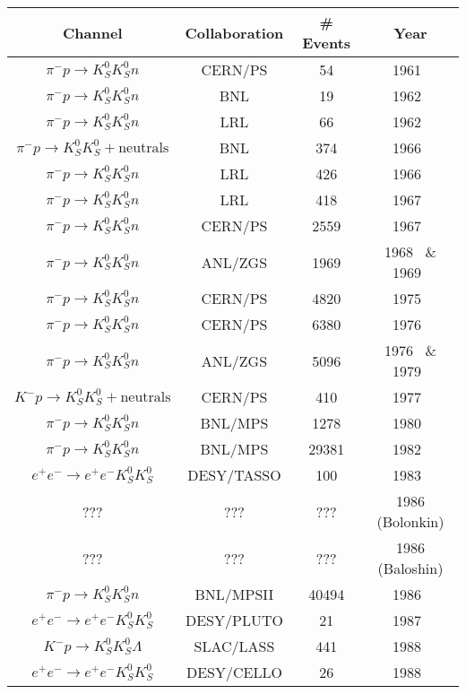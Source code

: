 \begin{table}
  \begin{center}
    \begin{tabular}{cccc}\toprule
      Channel & Collaboration & \# Events & Year\\\midrule
      $\pi^- p \to K_S^0 K_S^0 n$ & CERN/PS & 54 & 1961~\cite{DiCorato1961}\\
      $\pi^- p \to K_S^0 K_S^0 n$ & BNL & 19 & 1962~\cite{Erwin1962}\\
    $\pi^- p \to K_S^0 K_S^0 n$ & LRL & 66 & 1962~\cite{Alexander1962}\\
    $\pi^- p \to K_S^0 K_S^0 + \text{neutrals}$ & BNL & 374 & 1966~\cite{Crennell1966}\\
  $\pi^- p \to K_S^0 K_S^0 n$ & LRL & 426 & 1966~\cite{Hess1966}\\
  $\pi^- p \to K_S^0 K_S^0 n$ & LRL & 418 & 1967~\cite{Dahl1967}\\
  $\pi^- p \to K_S^0 K_S^0 n$ & CERN/PS & 2559 & 1967~\cite{Beusch1967}\\
  $\pi^- p \to K_S^0 K_S^0 n$ & ANL/ZGS & 1969 & 1968~\cite{Hoang1968} \& 1969~\cite{Hoang1969}\\
$\pi^- p \to K_S^0 K_S^0 n$ & CERN/PS & 4820 & 1975~\cite{Beusch1975}\\
$\pi^- p \to K_S^0 K_S^0 n$ & CERN/PS & 6380 & 1976~\cite{Wetzel1976}\\
$\pi^- p \to K_S^0 K_S^0 n$ & ANL/ZGS & 5096 & 1976~\cite{Cason1976} \& 1979~\cite{Polychronakos1979}\\
$K^- p \to K_S^0 K_S^0 + \text{neutrals}$ & CERN/PS & 410 & 1977~\cite{Barreiro1977}\\
$\pi^- p \to K_S^0 K_S^0 n$ & BNL/MPS & 1278 & 1980~\cite{Gottesman1980}\\
$\pi^- p \to K_S^0 K_S^0 n$ & BNL/MPS & 29381 & 1982~\cite{Etkin1982}\\
$e^+e^- \to e^+e^- K_S^0 K_S^0$ & DESY/TASSO & 100 & 1983~\cite{Althoff1983}\\
      ??? & ??? & ??? & 1986 (Bolonkin)\\
      ??? & ??? & ??? & 1986 (Baloshin)\\
    $\pi^- p \to K_S^0 K_S^0 n$ & BNL/MPSII & 40494 & 1986~\cite{Longacre1986}\\
  $e^+e^- \to e^+e^- K_S^0 K_S^0$ & DESY/PLUTO & 21 & 1987~\cite{Berger1988}\\
$K^- p \to K_S^0 K_S^0 \Lambda$ & SLAC/LASS & 441 & 1988~\cite{Aston1988}\\
$e^+e^- \to e^+e^- K_S^0 K_S^0$ & DESY/CELLO & 26 & 1988~\cite{Behrend1989}\\

\end{tabular}
\end{center}
\end{table}
